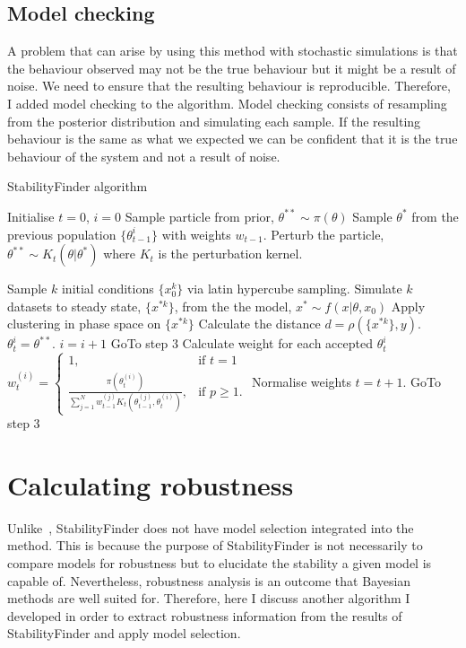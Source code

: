 \subsection{Model checking}
\label{sec:mod_check}
A problem that can arise by using this method with stochastic simulations is that the behaviour observed may not be the true behaviour but it might be a result of noise. We need to ensure that the resulting behaviour is reproducible. Therefore, I added model checking to the algorithm. Model checking consists of resampling from the posterior distribution and simulating each sample. If the resulting behaviour is the same as what we expected we can be confident that it is the true behaviour of the system and not a result of noise. 
\begin{algorithm}[htbp]

\caption{ StabilityFinder algorithm}
\label{alg:StabilityFinder}
 \begin{algorithmic}[1]
    \Statex
	\State Initialise $t=0$, 
	\State $i=0$ 
		\State Sample particle from prior, $\theta^{**} \sim \pi(\theta)$
	\Else
		\State Sample $\theta^*$ from the previous population $\{ \theta_{t-1}^{i} \}$ with weights $w_{t-1}$.
		\State Perturb the particle, $\theta^{**} \sim K_t(\theta|\theta^{*})$ where $K_t$ is the perturbation kernel.
	\EndIf
	
	\State Sample $k$ initial conditions $\{ x_0^k \}$ via latin hypercube sampling.
	\State Simulate $k$ datasets to steady state, $\{ x^{*k} \}$, from the the model, $ x^{*} \sim f(x|\theta, x_0)$
    	\State Apply clustering in phase space on $\{ x^{*k} \}$
    	\State Calculate the distance $ d = \rho( \{ x^{*k} \},y)$. 
	\State $\theta^{i}_{t} = \theta^{**}$.  $i = i + 1$
		GoTo step 3
	\Else
	\State Calculate weight for each accepted $\theta^{i}_t$
	\State $w_{t}^{(i)} = \begin{cases} 1, & \mbox{if } t = 1 \\\frac{\pi(\theta_{t}^{(i)})}{\sum_{j=1}^N w_{t-1}^{(j)} K_{t}(\theta_{t-1}^{(j)}, \theta_{t}^{(i)})}, & \mbox{if } p \geq  1. \end{cases}$
	\State Normalise weights
	\State $t = t + 1$. 
	\State GoTo step 3 
	\EndIf
	\EndIf
	\EndIf	
\end{algorithmic} 
\end{algorithm}

\clearpage

\section{Calculating robustness}
\label{sec:cal_rob}
Unlike~\textcite{Toni:2009tr}, StabilityFinder does not have model selection integrated into the method. This is because the purpose of StabilityFinder is not necessarily to compare models for robustness but to elucidate the stability a given model is capable of. Nevertheless, robustness analysis is an outcome that Bayesian methods are well suited for. Therefore, here I discuss another algorithm I developed in order to extract robustness information from the results of StabilityFinder and apply model selection.  

